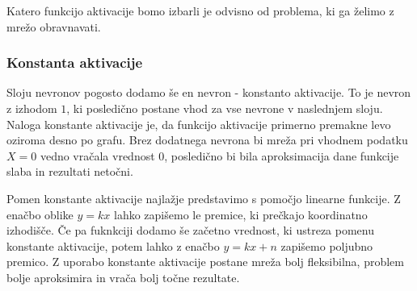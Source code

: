 \documentclass[mat1]{fmfdelo}
\begin{document}
Katero funkcijo aktivacije bomo izbarli je odvisno od problema, ki ga želimo z mrežo obravnavati.
%
\subsubsection{Konstanta aktivacije} \label{bias}
Sloju nevronov pogosto dodamo še en nevron - konstanto aktivacije. To je nevron z izhodom $1$, ki posledično postane vhod za vse nevrone v naslednjem sloju. Naloga konstante aktivacije je, da funkcijo aktivacije primerno premakne levo oziroma desno po grafu. Brez dodatnega nevrona bi mreža pri vhodnem podatku $X=0$ vedno vračala vrednost $0$, posledično bi bila aproksimacija dane funkcije slaba in rezultati netočni. 

Pomen konstante aktivacije najlažje predstavimo s pomočjo linearne funkcije. Z enačbo oblike $y = kx$ lahko zapišemo le premice, ki prečkajo koordinatno izhodišče. Če pa fuknkciji dodamo še začetno vrednost, ki ustreza pomenu konstante aktivacije, potem lahko z enačbo $y= kx + n$ zapišemo poljubno premico. Z uporabo konstante aktivacije postane mreža bolj fleksibilna, problem bolje aproksimira in vrača bolj točne rezultate. 
%
\end{document}
